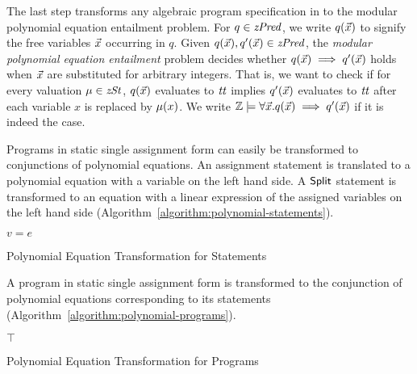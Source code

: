 
The last step transforms any algebraic program specification in \zdsl to the
modular polynomial equation entailment problem. For
$q \in \mathit{zPred}$, we write $q(\vec{x})$ to signify the free variables $\vec{x}$
occurring in $q$. Given $q(\vec{x}), q'(\vec{x}) \in \mathit{zPred}$, the \emph{modular
  polynomial equation entailment} problem decides whether
$q(\vec{x}) \implies q'(\vec{x})$ holds when $\vec{x}$ are substituted for
arbitrary integers. That is, we want to check if for every valuation $\mu \in \mathit{zSt}$, $q(\vec{x})$ evaluates to $\mathit{tt}$ implies $q'(\vec{x})$ evaluates to $\mathit{tt}$ after each variable $x$ is replaced by $\mu(x)$.
We write $\mathbb{Z} \models \forall \vec{x}. q(\vec{x}) \implies q'(\vec{x})$ if it is indeed the case.

Programs in static single assignment form can easily be transformed to
conjunctions of polynomial equations. An assignment statement is
translated to a polynomial equation with a variable on the left hand side.
A $\mbox{\textsf{Split}}$ statement is transformed to an
equation with a linear expression of the assigned variables on the
left hand side (Algorithm~\ref{algorithm:polynomial-statements}).
\begin{algorithm}
  \begin{algorithmic}[1]
        \Return $v = e$
      \EndCase
      \EndCase
    \EndMatch
    \EndFunction
  \end{algorithmic}
  \caption{Polynomial Equation Transformation for Statements}
  \label{algorithm:polynomial-statements}
\end{algorithm}

A program in static single assignment form is transformed to the
conjunction of polynomial equations corresponding to its statements
(Algorithm~\ref{algorithm:polynomial-programs}).

\begin{algorithm}
  \begin{algorithmic}[1]
      \Case{$\epsilon$} \Return $\top$ \EndCase
      \EndCase
    \EndMatch
    \EndFunction
  \end{algorithmic}
  \caption{Polynomial Equation Transformation for Programs}
  \label{algorithm:polynomial-programs}
\end{algorithm}

